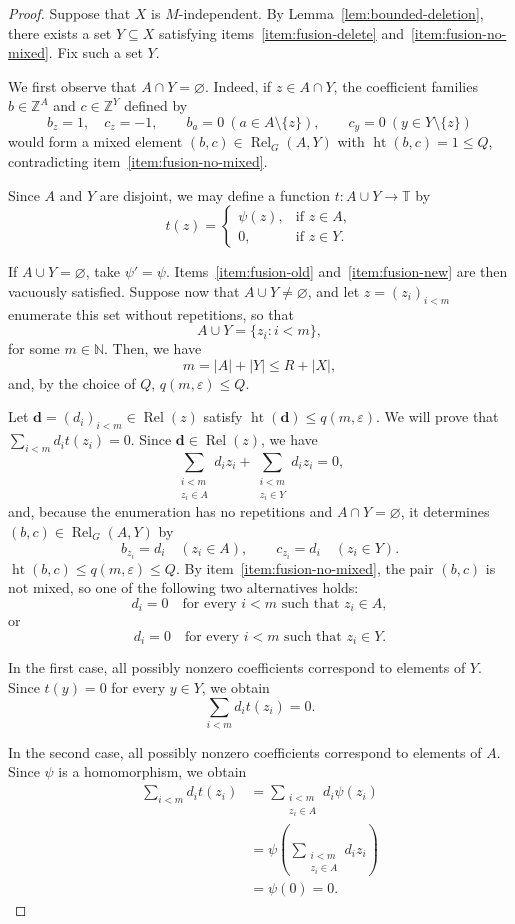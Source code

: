 \documentclass[11pt]{amsart}
\theoremstyle{definition}
\newcommand{\T}{\mathbb T}
\newcommand{\N}{\mathbb N}
\newcommand{\Z}{\mathbb Z}
\newcommand{\Rel}{\operatorname{Rel}}
\newcommand{\htop}{\operatorname{ht}}
\begin{document}
\begin{proof}
Suppose that $X$ is $M$-independent. By
Lemma~\ref{lem:bounded-deletion}, there exists a set $Y\subseteq X$
satisfying items~\ref{item:fusion-delete}
and~\ref{item:fusion-no-mixed}.  Fix such a set $Y$.

We first observe that $A\cap Y=\varnothing$. Indeed, if $z\in A\cap Y$, the
coefficient families $b\in\Z^A$ and $c\in\Z^Y$ defined by
\[
 b_z=1,\quad c_z=-1,
 \qquad b_a=0\ (a\in A\setminus\{z\}),
 \qquad c_y=0\ (y\in Y\setminus\{z\})
\]
would form a mixed element $(b,c)\in\Rel_G(A,Y)$ with
$\htop(b,c)=1\leq Q$, contradicting
item~\ref{item:fusion-no-mixed}.

Since $A$ and $Y$ are disjoint, we may define a function
$t:A\cup Y\to\T$ by
\[
t(z)=
\begin{cases}
\psi(z),&\text{if }z\in A,\\
0,&\text{if }z\in Y.
\end{cases}
\]

If $A\cup Y=\varnothing$, take $\psi'=\psi$.  Items~\ref{item:fusion-old}
and~\ref{item:fusion-new} are then vacuously
satisfied.  Suppose now that $A\cup Y\neq\varnothing$, and let
$z=(z_i)_{i<m}$ enumerate this set without repetitions, so that
\[
A\cup Y=\{z_i:i<m\},
\]
for some $m\in\N$. Then, we have
\[
m=|A|+|Y|\leq R+|X|,
\]
and, by the choice of $Q$, $q(m,\varepsilon)\leq Q$.

Let $\mathbf d=(d_i)_{i<m}\in\Rel(z)$ satisfy
$\htop(\mathbf d)\leq q(m,\varepsilon)$. We will prove that
$\sum_{i<m}d_i t(z_i)=0$.  Since $\mathbf d\in\Rel(z)$, we have
\[
\sum_{\substack{i<m\\z_i\in A}}d_i z_i
+
\sum_{\substack{i<m\\z_i\in Y}}d_i z_i
=0,
\]
and, because the enumeration has no repetitions and $A\cap Y=\varnothing$,
it determines $(b,c)\in\Rel_G(A,Y)$ by
\[
 b_{z_i}=d_i\quad(z_i\in A),
 \qquad
 c_{z_i}=d_i\quad(z_i\in Y).
\]
$\htop(b,c)\leq q(m,\varepsilon)\leq Q$.  By
item~\ref{item:fusion-no-mixed}, the pair
$(b,c)$ is not mixed, so one of the following two alternatives holds:
\[
d_i=0\quad\text{for every $i<m$ such that $z_i\in A$},
\]
or
\[
d_i=0\quad\text{for every $i<m$ such that $z_i\in Y$}.
\]

In the first case, all possibly nonzero coefficients correspond to
elements of $Y$. Since $t(y)=0$ for every $y\in Y$, we obtain
\[
\sum_{i<m}d_i t(z_i)=0.
\]

In the second case, all possibly nonzero coefficients correspond to
elements of $A$. Since $\psi$ is a homomorphism, we obtain
\[
\begin{aligned}
\sum_{i<m}d_i t(z_i)
&=
\sum_{\substack{i<m\\z_i\in A}}d_i\psi(z_i)\\
&=
\psi\left(
\sum_{\substack{i<m\\z_i\in A}}d_i z_i
\right)\\
&=\psi(0)=0.
\end{aligned}
\]


\end{proof}
\end{document}
